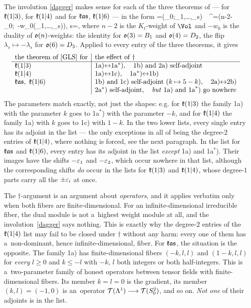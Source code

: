 \documentclass[12pt,a4paper]{amsart}
\newcommand {\lra} {{\leftrightarrow}}
\theoremstyle{thm}
\theoremstyle{definition}
\begin{document}
 The involution \eqref{dagger} makes sense for each of the three theorems of
\cite[\S10]{GLS} --- for ${\mathfrak{k}}(1|3)$, for ${\mathfrak{k}}(1|4)$ and for ${\mathfrak{k}}{\mathfrak{as}}$, ${\mathfrak{k}}(1|6)$ --- in
the form
\be\label{daggern}
\lambda=(\lambda_0;\lambda_1,\dots,\lambda_s)\ \longmapsto\
\lambda^\dagger=\big(n-2-\lambda_0;\ -w_0(\lambda_1,\dots,\lambda_s)\big),\qquad
s=\left[\frac n2\right],
\ee
where $n-2$ is the $K_t$-weight of $\Vol$ and $-w_0$ is the duality of
${\mathfrak{o}}(n)$-weights: the identity for ${\mathfrak{o}}(3)=B_1$ and ${\mathfrak{o}}(4)=D_2$, the flip
$\lambda_s\mapsto-\lambda_s$ for ${\mathfrak{o}}(6)=D_3$. Applied to every entry of the three
theorems, it gives
\[
\begin{array}{l|l}
\text{the theorem of \cite[\S10]{GLS} for}&\text{the effect of }\dagger\\
\hline
\fk(1|3)&\text{1a)}\lra\text{1a}^*\text{)},\quad\text{1b) and 2a) self-adjoint}\\
\fk(1|4)&\text{1a)}\lra\text{1c)},\quad\text{1a}^*\text{)}\lra\text{1b)}\\
\fk\fas,\ \fk(1|6)&\text{1b) and 1c) self-adjoint }(k\mapsto5-k),\quad
\text{2a)}\lra\text{2b)}\\
&\text{2a}^*\text{) self-adjoint},\quad
\text{\textit{but} 1a) and 1a}^*\text{) go nowhere}
\end{array}
\]
The parameters match exactly, not just the shapes: e.g. for ${\mathfrak{k}}(1|3)$ the family 1a) with
the parameter $k$ goes to 1a$^*$) with the parameter $-k$, and for ${\mathfrak{k}}(1|4)$ the family
1a) with $k$ goes to 1c) with $1-k$. In the two lower lists, every single entry has its
adjoint in the list --- the only exceptions in all of \cite[\S10]{GLS} being the degree-$2$
entries of ${\mathfrak{k}}(1|4)$, where nothing is forced, see the next paragraph. In the list for
${\mathfrak{k}}{\mathfrak{as}}$ and ${\mathfrak{k}}(1|6)$, every entry has its adjoint in the list \textit{except} 1a) and
1a$^*$). Their images have the shifts $-\varepsilon_1$ and $-\varepsilon_2$, which occur nowhere
in that list, although the corresponding shifts \textit{do} occur in the lists for
${\mathfrak{k}}(1|3)$ and ${\mathfrak{k}}(1|4)$, whose degree-$1$ parts carry all the $\pm\varepsilon_i$ at once.

 The
$\dagger$-argument is an argument about \textit{operators}, and it applies verbatim only
when both fibers are finite-dimensional. For an infinite-dimensional irreducible fiber,
the dual module is not a~highest weight module at all, and the involution~\eqref{dagger} says nothing.
This is exactly why the degree-$2$ entries of the ${\mathfrak{k}}(1|4)$ list may fail to be closed
under $\dagger$ without any harm: every one of them has a~non-dominant, hence
infinite-dimensional, fiber. For ${\mathfrak{k}}{\mathfrak{as}}$, the situation is the opposite. The family 1a)
has finite-dimensional fibers $(-k,l,l)$ and $(1-k,l,l)$ for \textit{every} $l\geq0$ and
$k\leq-l$ with $-k$, $l$ both integers or both half-integers. This is a~two-parameter family of
honest operators between tensor fields with finite-dimensional fibers. Its member
$k=l=0$ is the gradient, its member $(k,l)=(-1,0)$ is an~operator
${\mathcal T}(\Lambda^1)\longrightarrow{\mathcal T}(S^2_0)$, and so on. \textit{Not one} of their adjoints is in the list.
\end{document}
